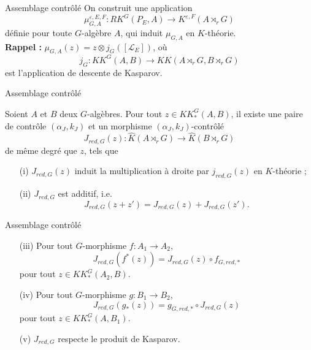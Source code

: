 \begin{frame}{Assemblage contrôlé}
On construit une application 
\[\mu_{G,A}^{\varepsilon, E,F} : RK^G(P_E,A) \rightarrow K^{\varepsilon, F}(A \rtimes_r G)\]
définie pour toute $G$-algèbre $A$, qui induit $\mu_{G,A}$ en $K$-théorie. \\ %
\vspace{0.3 cm}
\textbf{Rappel :} $\mu_{G,A}(z) = z\otimes j_G([\mathcal L_E])$, où
\[j_G : KK^G(A,B)\rightarrow KK(A\rtimes_r G, B\rtimes_r G)\]
est l'application de descente de Kasparov.
\end{frame}

\begin{frame}{Assemblage contrôlé}
\begin{propfr}
Soient $A$ et $B$ deux $G$-algèbres. Pour tout $z\in KK^G_*(A,B)$, il existe une paire de contrôle $(\alpha_J,k_J)$ et un morphisme $(\alpha_J,k_J)$-contrôlé
\[J_{red,G}(z) : \hat K(A\rtimes_r G)\rightarrow \hat K(B\rtimes_r G)\]
de même degré que $z$, tels que
\vspace{0.3 cm}
\begin{enumerate}
\item[(i)] $J_{red,G}(z)$ induit la multiplication à droite par $j_{red,G}(z)$ en $K$-théorie ;
\vspace{0.3 cm}
\item[(ii)] $J_{red,G}$ est additif, i.e.
\[J_{red,G}(z+z')=J_{red,G}(z)+J_{red,G}(z').\]
\end{enumerate}
\end{propfr}
\end{frame}

\begin{frame}{Assemblage contrôlé}
\begin{propfr}[suite]
\begin{enumerate}
\item[(iii)] Pour tout $G$-morphisme $f : A_1\rightarrow A_2$,
\[J_{red,G}(f^*(z))=J_{red,G}(z)\circ f_{G,red,*}\] pour tout $z\in KK_*^G(A_2,B)$.
\vspace{0.3 cm}
\item[(iv)] Pour tout $G$-morphisme $g : B_1\rightarrow B_2$,
\[J_{red,G}(g_*(z))= g_{G,red,*}\circ J_{red,G}(z)\] pour tout $z\in KK_*^G(A,B_1)$.
\vspace{0.3 cm}
\item[(v)] $J_{red,G}$ respecte le produit de Kasparov.
\end{enumerate}
\end{propfr}
\end{frame}

